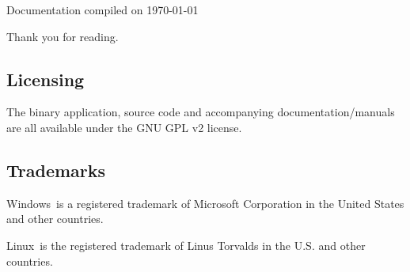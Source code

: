 \documentclass[letterpaper]{article}
\begin{document}
Documentation compiled on \today

Thank you for reading.

\subsection{Licensing}
The binary application, source code and accompanying documentation/manuals are all
available under the GNU GPL v2 license.

\subsection{Trademarks}
Windows\textregistered\ is a registered trademark of Microsoft Corporation in the United States and other countries.

Linux\textregistered\ is the registered trademark of Linus Torvalds in the U.S. and other countries.

\setlength{\parindent}{0mm}

\vfill \eject
\printindex
\end{document}
